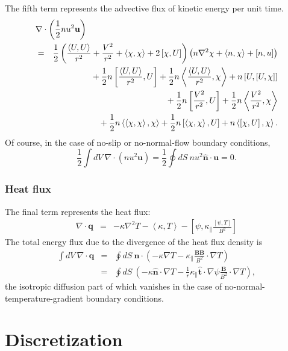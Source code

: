 \documentclass[draft]{book}
\renewcommand{\vec}[1]{\ensuremath{\mathbf{#1}}}
\newcommand{\B}{\vec{B}}
\renewcommand{\u}{\vec{u}}
\newcommand{\q}{\vec{q}}
\newcommand{\grad}[1]{\nabla #1}
\renewcommand{\div}[1]{\nabla \cdot #1}
\newcommand{\lp}[1]{\nabla^2 #1}
\newcommand{\pb}[2]{\left[#1,#2\right]}
\newcommand{\ip}[2]{\left\langle  #1,#2\right\rangle}
\newcommand{\uvec}[1]{\ensuremath{\vec{\hat{#1}}}}
\begin{document}
The fifth term represents the advective flux of kinetic energy per
unit time.
\begin{eqnarray*}
  \lefteqn{\div \left(\frac{1}{2} n u^2 \u \right)}  \\
  & = & 
  \frac{1}{2} \left(\frac{\ip{U}{U}}{r^2} + \frac{V^2}{r^2} +
  \ip{\chi}{\chi} + 2\pb{\chi}{U}\right) \left(n \lp \chi +
  \ip{n}{\chi} + \pb{n}{u} \right) 
   \\ & & \mbox{} 
  + \frac{1}{2} n \pb{\frac{\ip{U}{U}}{r^2}}{U}
  + \frac{1}{2} n \ip{\frac{\ip{U}{U}}{r^2}}{\chi}
  + n \pb{U}{\pb{U}{\chi}}
   \\ & & \mbox{} 
  + \frac{1}{2} n \pb{\frac{V^2}{r^2}}{U}
  + \frac{1}{2} n \ip{\frac{V^2}{r^2}}{\chi}
   \\ & & \mbox{} 
  + \frac{1}{2} n \ip{\ip{\chi}{\chi}}{\chi}
  + \frac{1}{2} n \pb{\ip{\chi}{\chi}}{U}
  + n \ip{\pb{\chi}{U}}{\chi}.
\end{eqnarray*}
Of course, in the case of no-slip or no-normal-flow boundary
conditions, 
\begin{equation}
  \frac{1}{2} \int dV\ \div \left(n u^2 \u\right) = 
  \frac{1}{2} \oint dS\ n u^2 \uvec{n} \cdot \u
  = 0.
\end{equation}


\subsection{Heat flux}

The final term represents the heat flux:
\begin{eqnarray*}
  \div \q & = & -\kappa \lp{T} - \ip{\kappa}{T} 
  - \pb{\psi}{\kappa_\parallel \frac{\pb{\psi}{T}}{B^2}}
\end{eqnarray*}
The total energy flux due to the divergence of the heat flux density
is
\begin{eqnarray*}
  \int dV\ \div \q & = & 
  \oint dS\ \uvec{n} \cdot \left(-\kappa \grad T 
   - \kappa_\parallel \frac{\B \B}{B^2} \cdot \grad T\right)
   \\
   & = & \oint dS\ \left(-\kappa \uvec{n} \cdot \grad T 
   - \frac{1}{r} \kappa_\parallel \uvec{t}\cdot \grad \psi 
   \frac{\B}{B^2} \cdot \grad T\right),
\end{eqnarray*}
the isotropic diffusion part of which vanishes in the case of
no-normal-tem\-per\-a\-ture-grad\-i\-ent boundary conditions.

\chapter{Discretization}
\end{document}
